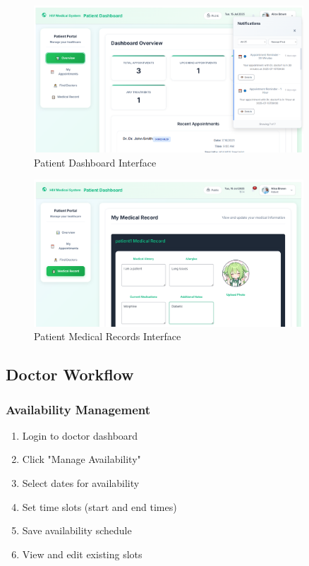 \documentclass[12pt,a4paper]{article}
\begin{document}
\begin{figure}[H]
\centering
\includegraphics[width=0.9\textwidth]{images/patient_dashboard.png}
\caption{Patient Dashboard Interface}
\label{fig:patient-dashboard}
\end{figure}

\begin{figure}[H]
\centering
\includegraphics[width=0.9\textwidth]{images/patient_records.png}
\caption{Patient Medical Records Interface}
\label{fig:patient-records}
\end{figure}

\subsection{Doctor Workflow}

\subsubsection{Availability Management}

\begin{enumerate}
    \item Login to doctor dashboard
    \item Click "Manage Availability"
    \item Select dates for availability
    \item Set time slots (start and end times)
    \item Save availability schedule
    \item View and edit existing slots
\end{enumerate}
\end{document}
